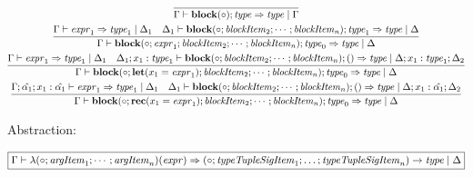 \begin{gather*}
  \infer{\Gamma \vdash \mathbf{block}(\circ); \mathit{type} \Rightarrow \mathit{type} \mid \Gamma}{}
  \\
  \infer{\Gamma \vdash \mathbf{block}(\circ; \mathit{expr}_1; \mathit{blockItem}_2; \cdots; \mathit{blockItem}_n); \mathit{type}_0 \Rightarrow \mathit{type} \mid \Delta}{
    \Gamma \vdash \mathit{expr}_1 \Rightarrow \mathit{type}_1 \mid \Delta_1
    &
    \Delta_1 \vdash \mathbf{block}(\circ; \mathit{blockItem}_2; \cdots; \mathit{blockItem}_n); \mathit{type}_1 \Rightarrow \mathit{type} \mid \Delta
  }
  \\
  \infer{\Gamma \vdash \mathbf{block}(\circ; \mathbf{let}(x_1 = \mathit{expr}_1); \mathit{blockItem}_2; \cdots; \mathit{blockItem}_n); \mathit{type}_0 \Rightarrow \mathit{type} \mid \Delta}{
    \Gamma \vdash \mathit{expr}_1 \Rightarrow \mathit{type}_1 \mid \Delta_1
    &
    \Delta_1; x_1: \mathit{type}_1 \vdash \mathbf{block}(\circ; \mathit{blockItem}_2; \cdots; \mathit{blockItem}_n); () \Rightarrow \mathit{type} \mid \Delta; x_1: \mathit{type}_1; \Delta_2
  }
  \\
  \infer{\Gamma \vdash \mathbf{block}(\circ; \mathbf{rec}(x_1 = \mathit{expr}_1); \mathit{blockItem}_2; \cdots; \mathit{blockItem}_n); \mathit{type}_0 \Rightarrow \mathit{type} \mid \Delta}{
    \Gamma; \hat{\alpha_1}; x_1: \hat{\alpha_1} \vdash \mathit{expr}_1 \Rightarrow \mathit{type}_1 \mid \Delta_1
    &
    \Delta_1 \vdash \mathbf{block}(\circ; \mathit{blockItem}_2; \cdots; \mathit{blockItem}_n); () \Rightarrow \mathit{type} \mid \Delta; x_1: \hat{\alpha_1}; \Delta_2
  }
\end{gather*}

Abstraction:

$\fbox{$\Gamma \vdash \lambda(\circ; \mathit{argItem}_1; \cdots; \mathit{argItem}_n)(\mathit{expr}) \Rightarrow (\circ; \mathit{typeTupleSigItem}_1; \ldots; \mathit{typeTupleSigItem}_n) \rightarrow \mathit{type} \mid \Delta$}$

